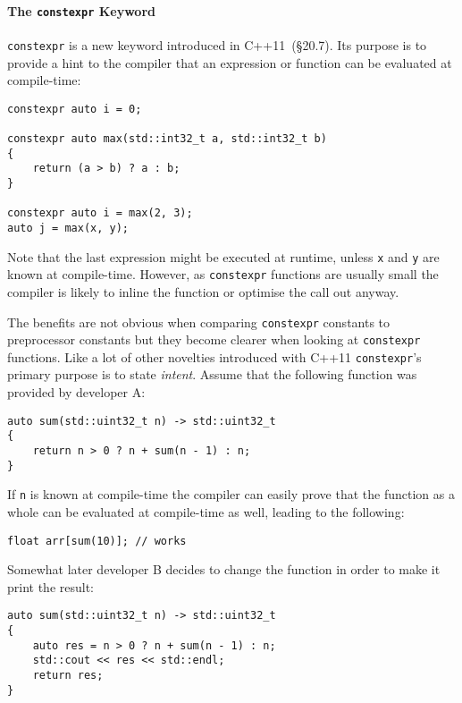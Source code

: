 \paragraph{The \texttt{constexpr} Keyword}

\texttt{constexpr} is a new keyword introduced in C++11~\cite{cpp11std}(§20.7). Its purpose is to provide a hint to the compiler that an expression or function can be evaluated at compile-time:

\begin{verbatim}
constexpr auto i = 0;

constexpr auto max(std::int32_t a, std::int32_t b)
{
    return (a > b) ? a : b;
}

constexpr auto i = max(2, 3);
auto j = max(x, y);
\end{verbatim}

\noindent Note that the last expression might be executed at runtime, unless \texttt{x} and \texttt{y} are known at compile-time. However, as \texttt{constexpr} functions are usually small the compiler is likely to inline the function or optimise the call out anyway.

The benefits are not obvious when comparing \texttt{constexpr} constants to preprocessor constants but they become clearer when looking at \texttt{constexpr} functions. Like a lot of other novelties introduced with C++11 \texttt{constexpr}'s primary purpose is to state \textit{intent}. Assume that the following function was provided by developer A:

\begin{verbatim}
auto sum(std::uint32_t n) -> std::uint32_t
{
    return n > 0 ? n + sum(n - 1) : n;
}
\end{verbatim}

\noindent If \texttt{n} is known at compile-time the compiler can easily prove that the function as a whole can be evaluated at compile-time as well, leading to the following:

\begin{verbatim}
float arr[sum(10)]; // works
\end{verbatim}

\noindent Somewhat later developer B decides to change the function in order to make it print the result:

\begin{verbatim}
auto sum(std::uint32_t n) -> std::uint32_t
{
    auto res = n > 0 ? n + sum(n - 1) : n;
    std::cout << res << std::endl;
    return res;
}
\end{verbatim}

